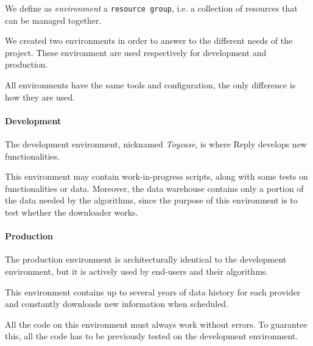 We define as \textit{environment} a \texttt{resource group}, i.e. a collection of resources that can be managed together.

We created two environments in order to answer to the different needs of the project.
These environment are used respectively for development and production.

All environments have the same tools and configuration, the only difference is how they are used.

\paragraph{Development}
    The development environment, nicknamed \textit{Toycase}, is where Reply develops new functionalities.
    
    This environment may contain work-in-progress scripts, along with some tests on functionalities or data.
    Moreover, the data warehouse contains only a portion of the data needed by the algorithms, since the purpose of this environment is to test whether the downloader works.
    
\paragraph{Production}
    The production environment is architecturally identical to the development environment, but it is actively used by end-users and their algorithms.
    
    This environment contains up to several years of data history for each provider and constantly downloads new information when scheduled.
    
    All the code on this environment must always work without errors.
    To guarantee this, all the code has to be previously tested on the development environment.

